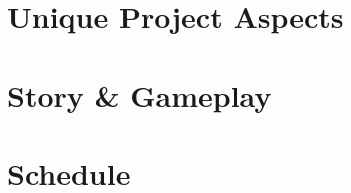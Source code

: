 \documentclass[titlepage]{article}
\begin{document}
\section{Unique Project Aspects}

\section{Story \& Gameplay}

\section{Schedule}
\end{document}
